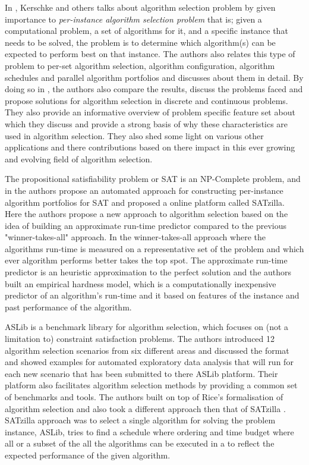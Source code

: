 In \citep{kerschke2018automated}, Kerschke and others talks about algorithm selection problem by given importance to \textit{per-instance algorithm selection problem} that is; given a computational problem, a set of algorithms for it, and a specific instance that needs to be solved, the problem is to determine which algorithm(s) can be expected to perform best on that instance. The authors also relates this type of problem to per-set algorithm selection, algorithm configuration, algorithm schedules and parallel algorithm portfolios and discusses about them in detail. By doing so in \citep{kerschke2018automated}, the authors also compare the results, discuss the problems faced and propose solutions for algorithm selection in discrete and continuous problems. They also provide an informative overview of problem specific feature set about which they discuss and provide a strong basis of why these characteristics are used in algorithm selection. They also shed some light on various other applications and there contributions based on there impact in this ever growing and evolving field of algorithm selection.

The propositional satisfiability problem or SAT is an NP-Complete problem, and in \citep{xu-et-al} the authors propose an automated approach for constructing per-instance algorithm portfolios for SAT and proposed a online platform called SATzilla. Here the authors propose a new approach to algorithm selection based on the idea of building an approximate run-time predictor compared to the previous "winner-takes-all" approach. In the winner-takes-all approach where the algorithms run-time is measured on a representative set of the problem and which ever algorithm performs better takes the top spot. The approximate run-time predictor is an heuristic approximation to the perfect solution and the authors built an empirical hardness model, which is a computationally inexpensive predictor of an algorithm’s run-time and it based on features of the instance and past performance of the algorithm.

ASLib \citep{bischl-et-al} is a benchmark library for algorithm selection, which focuses on (not a limitation to) constraint satisfaction problems. The authors introduced 12 algorithm selection scenarios from six diﬀerent areas and discussed the format and showed examples for automated exploratory data analysis that will run for each new scenario that has been submitted to there ASLib platform. Their platform also facilitates algorithm selection methods by providing a common set of benchmarks and tools. The authors built on top of Rice's \citep{rice197665} formalisation of algorithm selection and also took a different approach then that of SATzilla \citep{xu-et-al}. SATzilla approach was to select a single algorithm for solving the problem instance, ASLib, tries to find a schedule where ordering and time budget where all or a subset of the all the algorithms can be executed in a to reflect the expected performance of the given algorithm.

